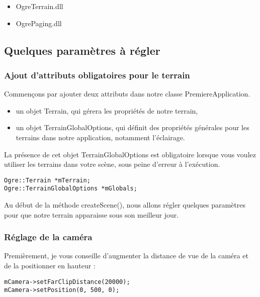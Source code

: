 \begin{itemize}
\item OgreTerrain.dll
\item OgrePaging.dll
\end{itemize}




\subsection{Quelques param\`etres \`a r\'egler}

\subsubsection{Ajout d'attributs obligatoires pour le terrain}

Commen\c{c}ons par ajouter deux attributs dans notre classe PremiereApplication.

\begin{itemize}
\item un objet Terrain, qui g\'erera les propri\'et\'es de notre terrain,
\item un objet TerrainGlobalOptions, qui d\'efinit des propri\'et\'es g\'en\'erales pour les terrains dans notre application, notamment l'\'eclairage.\newline
\end{itemize}

La pr\'esence de cet objet TerrainGlobalOptions est obligatoire lorsque vous voulez utiliser les terrains dans votre sc\`ene, sous peine d'erreur \`a l'ex\'ecution.

\begin{lstlisting}[caption={Attributs pour la gestion de terrain}]
Ogre::Terrain *mTerrain;
Ogre::TerrainGlobalOptions *mGlobals;
\end{lstlisting}

Au d\'ebut de la m\'ethode createScene(), nous allons r\'egler quelques param\`etres pour que notre terrain apparaisse sous son meilleur jour.

\subsubsection{R\'eglage de la cam\'era}
Premi\`erement, je vous conseille d'augmenter la distance de vue de la cam\'era et de la positionner en hauteur :

\begin{lstlisting}[caption={R\'eglage de la cam\'era}]
mCamera->setFarClipDistance(20000);
mCamera->setPosition(0, 500, 0);
\end{lstlisting}

